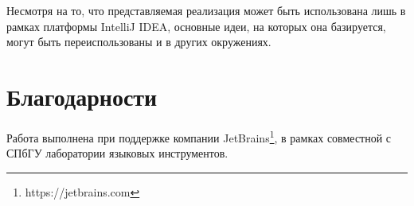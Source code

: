 \documentclass[conference]{IEEEtran}
\begin{document}
Несмотря на то, что представляемая реализация может быть использована
лишь в рамках платформы IntelliJ IDEA,
основные идеи, на которых она базируется,
могут быть переиспользованы и в других окружениях.


\section*{Благодарности}
Работа выполнена при поддержке компании JetBrains\footnote{https://jetbrains.com}, в рамках совместной с СПбГУ лаборатории языковых инструментов.

\nocite{*}

\end{document}
